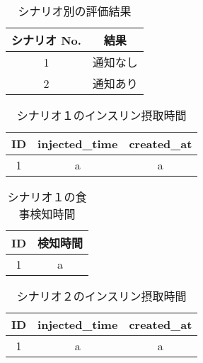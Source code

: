 \begin{table}[htbp]
  \caption{シナリオ別の評価結果}
  \label{tb:result_scenarios}
  \begin{center}
    \begin{tabular}{|c||c|}
      \hline
      シナリオ No.  & 結果 \\
      \hline\hline
      1  & 通知なし \\\hline
      2 & 通知あり \\\hline
    \end{tabular}
  \end{center}
\end{table}

\begin{table}[htbp]
  \caption{シナリオ１のインスリン摂取時間}
  \label{tb:scenario_1_insulin}
  \begin{center}
    \begin{tabular}{|c||c|c|}
      \hline
      ID  & injected\_time & created\_at \\
      \hline\hline
      1 & a & a \\\hline
    \end{tabular}
  \end{center}
\end{table}

\begin{table}[htbp]
  \caption{シナリオ１の食事検知時間}
  \label{tb:scenario_1_meal}
  \begin{center}
    \begin{tabular}{|c||c|}
      \hline
      ID  & 検知時間 \\
      \hline\hline
      1 & a \\\hline
    \end{tabular}
  \end{center}
\end{table}

\begin{table}[htbp]
  \caption{シナリオ２のインスリン摂取時間}
  \label{tb:scenario_1_insulin}
  \begin{center}
    \begin{tabular}{|c||c|c|}
      \hline
      ID  & injected\_time & created\_at \\
      \hline\hline
      1 & a & a \\\hline
    \end{tabular}
  \end{center}
\end{table}

